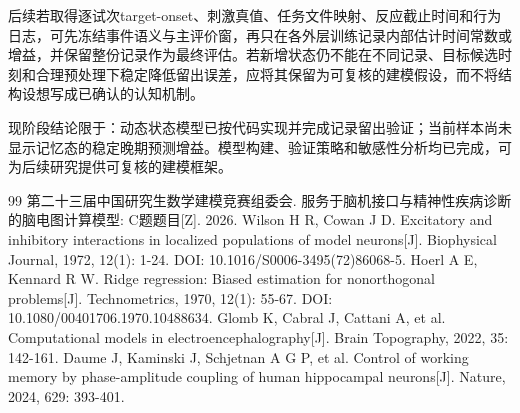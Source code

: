 \documentclass[UTF8,a4paper,12pt]{ctexart}
\begin{document}
后续若取得逐试次target-onset、刺激真值、任务文件映射、反应截止时间和行为日志，可先冻结事件语义与主评价窗，再只在各外层训练记录内部估计时间常数或增益，并保留整份记录作为最终评估。若新增状态仍不能在不同记录、目标候选时刻和合理预处理下稳定降低留出误差，应将其保留为可复核的建模假设，而不将结构设想写成已确认的认知机制。

现阶段结论限于：动态状态模型已按代码实现并完成记录留出验证；当前样本尚未显示记忆态的稳定晚期预测增益。模型构建、验证策略和敏感性分析均已完成，可为后续研究提供可复核的建模框架。

\begin{thebibliography}{99}
 第二十三届中国研究生数学建模竞赛组委会. 服务于脑机接口与精神性疾病诊断的脑电图计算模型: C题题目[Z]. 2026.
 Wilson H R, Cowan J D. Excitatory and inhibitory interactions in localized populations of model neurons[J]. Biophysical Journal, 1972, 12(1): 1-24. DOI: 10.1016/S0006-3495(72)86068-5.
 Hoerl A E, Kennard R W. Ridge regression: Biased estimation for nonorthogonal problems[J]. Technometrics, 1970, 12(1): 55-67. DOI: 10.1080/00401706.1970.10488634.
 Glomb K, Cabral J, Cattani A, et al. Computational models in electroencephalography[J]. Brain Topography, 2022, 35: 142-161.
 Daume J, Kaminski J, Schjetnan A G P, et al. Control of working memory by phase-amplitude coupling of human hippocampal neurons[J]. Nature, 2024, 629: 393-401.
\end{thebibliography}
\end{document}
